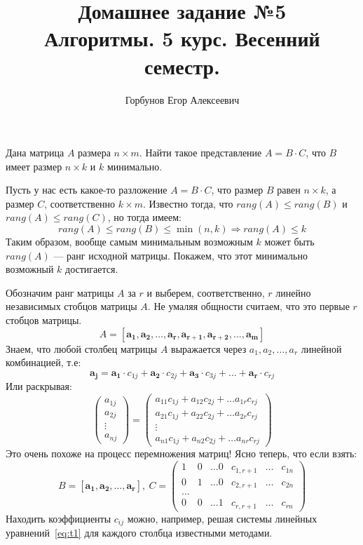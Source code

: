 
\title{Домашнее задание №5 \\ Алгоритмы. 5 курс. Весенний семестр.}
\author{Горбунов Егор Алексеевич}


\maketitle

\begin{task}[1]
Дана матрица $A$ размера $n \times m$. Найти такое представление $A = B \cdot C$, что $B$ имеет размер $n \times k$
и $k$ минимально.
\end{task}
\begin{solution} Пусть у нас есть какое-то разложение $A = B \cdot C$, что размер $B$ равен $n \times k$, а размер $C$, соответственно $k \times m$. Известно тогда, что $rang(A) \leqslant rang(B)$ и $rang(A) \leqslant rang(C)$, но тогда имеем:
\[
	rang(A) \leqslant rang(B) \leqslant \min{(n, k)} \Rightarrow rang(A) \leqslant k
\]
Таким образом, вообще самым минимальным возможным $k$ может быть $rang(A)$ --- ранг исходной матрицы. Покажем, что этот минимально возможный $k$ достигается.

Обозначим ранг матрицы $A$ за $r$ и выберем, соответственно, $r$ линейно независимых стобцов матрицы $A$. Не умаляя общности считаем, что это первые $r$ стобцов матрицы.
\[
	A = \left[ \bm{a_1}, \bm{a_2}, \ldots, \bm{a_r}, \bm{a_{r+1}}, \bm{a_{r+2}}, ..., \bm{a_{m}} \right]
\]
Знаем, что любой столбец матрицы $A$ выражается через $a_1, a_2, \ldots, a_r$ линейной комбинацией, т.е:
\[
	\bm{a_j} = \bm{a_1} \cdot c_{1j} + \bm{a_2} \cdot c_{2j} + \bm{a_3} \cdot c_{3j} + \ldots + \bm{a_r} \cdot c_{rj}
\]
Или раскрывая:
\begin{equation}
\label{eq:t1}
	\begin{pmatrix}
		a_{1j}\\
		a_{2j}\\
		\vdots\\
		a_{nj} 
	\end{pmatrix}
	=
	\begin{pmatrix}
		a_{11}c_{1j} + a_{12}c_{2j} + \ldots a_{1r}c_{rj}\\
		a_{21}c_{1j} + a_{22}c_{2j} + \ldots a_{2r}c_{rj}\\
		\vdots\\
		a_{n1}c_{1j} + a_{n2}c_{2j} + \ldots a_{nr}c_{rj}

	\end{pmatrix}
\end{equation}
Это очень похоже на процесс перемножения матриц! Ясно теперь, что если взять:
\[
	B = \left[ \bm{a_1}, \bm{a_2}, \ldots, \bm{a_r} \right],\ C = 
	\begin{pmatrix}
		1 & 0 & \ldots 0 & c_{1,{r + 1}} & \ldots & c_{1n} \\
		0 & 1 & \ldots 0 & c_{2,r + 1} & \ldots & c_{2n} \\
		\ldots \\
		0 & 0 & \ldots 1 & c_{r,r + 1} & \ldots & c_{rn}
	\end{pmatrix}
\]
Находить коэффициенты $c_{ij}$ можно, например, решая системы линейных уравнений~\ref{eq:t1} для каждого столбца известными методами.
\xqed
\end{solution}

